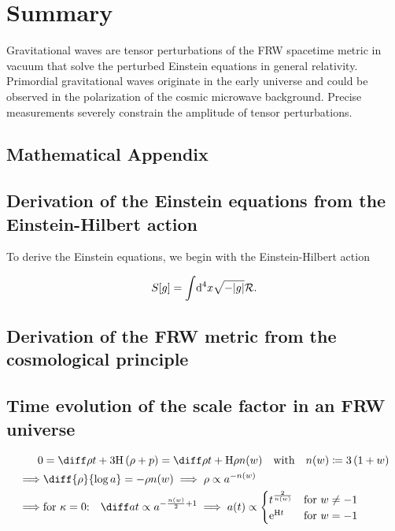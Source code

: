 \documentclass[12pt,parskip=half]{scrreprt}
\begin{document}
\chapter{Summary}\label{ch:summary}

Gravitational waves are tensor perturbations of the FRW spacetime metric in vacuum that solve the perturbed Einstein equations in general relativity. Primordial gravitational waves originate in the early universe and could be observed in the polarization of the cosmic microwave background. Precise measurements severely constrain the amplitude of tensor perturbations.






\begin{appendices}

\chapter{Mathematical Appendix}

\section{Derivation of the Einstein equations from the Einstein-Hilbert action}\label{app:deriv_einstein_eqns}

To derive the Einstein equations, we begin with the Einstein-Hilbert action

\begin{align}
	S[g] = \int \! \dif{^4x} \sqrt{-|g|} \Rscal \eqpunct{.}
\end{align}


\section{Derivation of the FRW metric from the cosmological principle}\label{app:deriv_frw}

\section{Time evolution of the scale factor in an FRW universe}\label{app:deriv_frw_a_evol}

\begin{align}
	0 &= \dt{\rho} + 3\Hcosm\del{\rho + p} = \dt{\rho} + \Hcosm\rho \nexp \quad \text{with} \quad \nexp \defeq 3\del{1 + \eosp} \\
	\implies &\diff{\rho}{\efold} = -\rho\nexp \implies \rho \propto a^{-\nexp} \\
	\implies &\text{for \(\spatcurv=0\):} \quad \dt{a} \propto a^{-\frac{\nexp}{2}+1} \implies a(t) \propto
	\begin{cases}
		t^{\frac{2}{\nexp}} &\text{for \(\eosp\neq-1\)} \\
		\eul^{\Hcosm t} &\text{for \(\eosp=-1\)}
	\end{cases}
\end{align}



\end{appendices}
\end{document}
